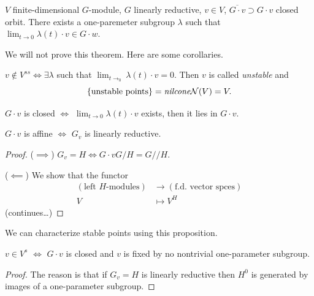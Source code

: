 \begin{theorem}
\label{theorem-Hilbert-Mumford-criterion}
$V$ finite-dimensional $G$-module, $G$
linearly reductive, $v \in V$,
$\overline{G\cdot v}\supset G\cdot v$ closed
orbit. There exists a one-paremeter subgroup
$\lambda$ such that $\lim_{t \to 0}
\lambda(t)\cdot v \in G\cdot w$.
\end{theorem}

We will not prove this theorem. Here are some
corollaries.

\begin{lemma}
\label{lemma-unstable}
$v \not \in V^{ss} \iff \exists  \lambda$
such that $\lim_{t\to_0}\lambda(t)\cdot v
=0$. Then $v$ is called {\it unstable} and
$$
\{\text{unstable points}\}=\text{{\it
nilcone}} \mathcal{N}(V)=V.
$$
\end{lemma}

\begin{lemma}
\label{git-label-013}
$G\cdot v$ is closed $\iff$ $\lim_{t \to 0}
\lambda(t)\cdot v$ exists, then it lies in
$G\cdot v$.
\end{lemma}

\begin{proposition}
\label{git-label-014}
$G\cdot v$ is affine $\iff$ $G_v$ is linearly
reductive.
\end{proposition}

\begin{proof}
($\implies$) $G_v = H \iff G\cdot v
G/H=G/\!/H$.

($\impliedby$) We show that the functor
$$
\begin{aligned}
(\text{left $H$-modules}) &\longrightarrow
(\text{f.d. vector spces}) \\
V &\longmapsto V^H
\end{aligned}
$$
(continues\ldots{})
\end{proof}

We can characterize stable points using this
proposition.

\begin{lemma}
\label{git-label-015}
$v \in V^s$ $\iff$ $G\cdot v$ is closed and
$v$ is fixed by no nontrivial one-parameter
subgroup.
\end{lemma}

\begin{proof}
The reason is that if $G_v=H$ is linearly
reductive then $H^0$ is generated by images
of a one-parameter subgroup.
\end{proof}

